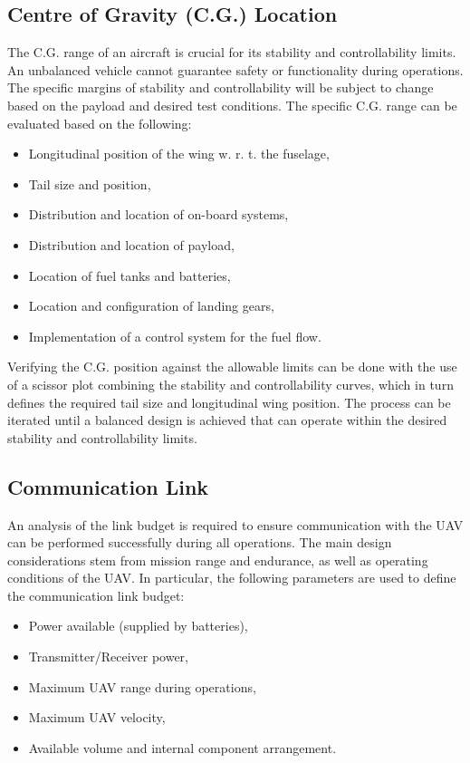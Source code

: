 \subsection{Centre of Gravity (C.G.) Location}
The C.G. range of an aircraft is crucial for its stability and controllability limits. An unbalanced vehicle cannot guarantee safety or functionality during operations. The specific margins of stability and controllability will be subject to change based on the payload and desired test conditions. The specific C.G. range can be evaluated based on the following:
\begin{itemize}
    \item Longitudinal position of the wing w. r. t. the fuselage,
    \item Tail size and position,
    \item Distribution and location of on-board systems,
    \item Distribution and location of payload,
    \item Location of fuel tanks and batteries,
    \item Location and configuration of landing gears,
    \item Implementation of a control system for the fuel flow.
\end{itemize}

Verifying the C.G. position against the allowable limits can be done with the use of a scissor plot combining the stability and controllability curves, which in turn defines the required tail size and longitudinal wing position. The process can be iterated until a balanced design is achieved that can operate within the desired stability and controllability limits.

\subsection{Communication Link}
An analysis of the link budget is required to ensure communication with the UAV can be performed successfully during all operations. The main design considerations stem from mission range and endurance, as well as operating conditions of the UAV. In particular, the following parameters are used to define the communication link budget:
\begin{itemize}
    \item Power available (supplied by batteries),
    \item Transmitter/Receiver power,
    \item Maximum UAV range during operations,
    \item Maximum UAV velocity,
    \item Available volume and internal component arrangement.
\end{itemize}

